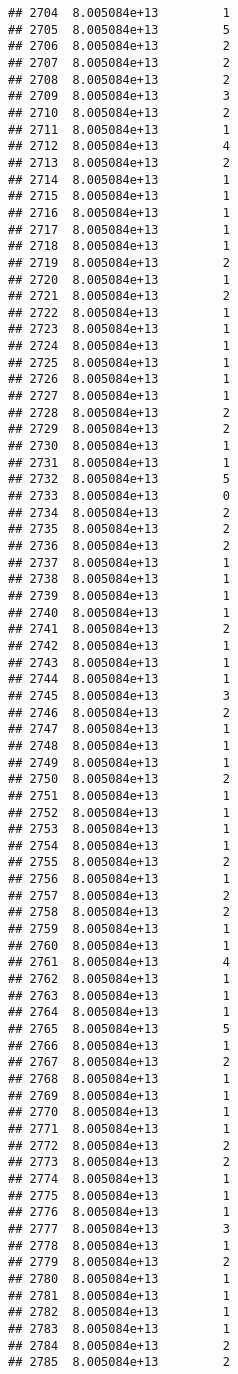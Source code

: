 \documentclass[
]{article}
\begin{document}
\begin{verbatim}
## 2704  8.005084e+13         1
## 2705  8.005084e+13         5
## 2706  8.005084e+13         2
## 2707  8.005084e+13         2
## 2708  8.005084e+13         2
## 2709  8.005084e+13         3
## 2710  8.005084e+13         2
## 2711  8.005084e+13         1
## 2712  8.005084e+13         4
## 2713  8.005084e+13         2
## 2714  8.005084e+13         1
## 2715  8.005084e+13         1
## 2716  8.005084e+13         1
## 2717  8.005084e+13         1
## 2718  8.005084e+13         1
## 2719  8.005084e+13         2
## 2720  8.005084e+13         1
## 2721  8.005084e+13         2
## 2722  8.005084e+13         1
## 2723  8.005084e+13         1
## 2724  8.005084e+13         1
## 2725  8.005084e+13         1
## 2726  8.005084e+13         1
## 2727  8.005084e+13         1
## 2728  8.005084e+13         2
## 2729  8.005084e+13         2
## 2730  8.005084e+13         1
## 2731  8.005084e+13         1
## 2732  8.005084e+13         5
## 2733  8.005084e+13         0
## 2734  8.005084e+13         2
## 2735  8.005084e+13         2
## 2736  8.005084e+13         2
## 2737  8.005084e+13         1
## 2738  8.005084e+13         1
## 2739  8.005084e+13         1
## 2740  8.005084e+13         1
## 2741  8.005084e+13         2
## 2742  8.005084e+13         1
## 2743  8.005084e+13         1
## 2744  8.005084e+13         1
## 2745  8.005084e+13         3
## 2746  8.005084e+13         2
## 2747  8.005084e+13         1
## 2748  8.005084e+13         1
## 2749  8.005084e+13         1
## 2750  8.005084e+13         2
## 2751  8.005084e+13         1
## 2752  8.005084e+13         1
## 2753  8.005084e+13         1
## 2754  8.005084e+13         1
## 2755  8.005084e+13         2
## 2756  8.005084e+13         1
## 2757  8.005084e+13         2
## 2758  8.005084e+13         2
## 2759  8.005084e+13         1
## 2760  8.005084e+13         1
## 2761  8.005084e+13         4
## 2762  8.005084e+13         1
## 2763  8.005084e+13         1
## 2764  8.005084e+13         1
## 2765  8.005084e+13         5
## 2766  8.005084e+13         1
## 2767  8.005084e+13         2
## 2768  8.005084e+13         1
## 2769  8.005084e+13         1
## 2770  8.005084e+13         1
## 2771  8.005084e+13         1
## 2772  8.005084e+13         2
## 2773  8.005084e+13         2
## 2774  8.005084e+13         1
## 2775  8.005084e+13         1
## 2776  8.005084e+13         1
## 2777  8.005084e+13         3
## 2778  8.005084e+13         1
## 2779  8.005084e+13         2
## 2780  8.005084e+13         1
## 2781  8.005084e+13         1
## 2782  8.005084e+13         1
## 2783  8.005084e+13         1
## 2784  8.005084e+13         2
## 2785  8.005084e+13         2

\end{verbatim}
\end{document}
